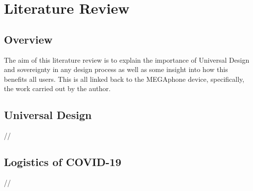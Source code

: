 
\chapter{Literature Review} %

\label{Chapter2} %


\section{Overview}

The aim of this literature review is to explain the importance of Universal Design and sovereignty in any design process as well as some insight into how this benefits all users. 
This is all linked back to the MEGAphone device, specifically, the work carried out by the author.


\section{Universal Design}

//


\section{Logistics of COVID-19}


//


